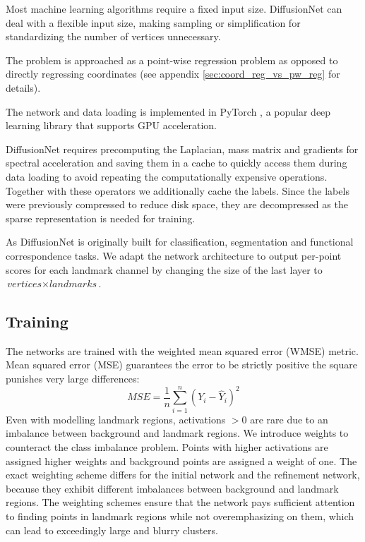 \documentclass[class=article, crop=false]{standalone}
\begin{document}
Most machine learning algorithms require a fixed input size. DiffusionNet can deal with a flexible input size, making sampling or simplification for standardizing the number of vertices unnecessary.

The problem is approached as a point-wise regression problem as opposed to directly regressing coordinates (see appendix \ref{sec:coord_reg_vs_pw_reg} for details).

The network and data loading is implemented in PyTorch \cite{NEURIPS2019_9015}, a popular deep learning library that supports GPU acceleration.

DiffusionNet requires precomputing the Laplacian, mass matrix and gradients for spectral acceleration and saving them in a cache to quickly access them during data loading to avoid repeating the computationally expensive operations. Together with these operators we additionally cache the labels. Since the labels were previously compressed to reduce disk space, they are decompressed as the sparse representation is needed for training.

As DiffusionNet is originally built for classification, segmentation and functional correspondence tasks. We adapt the network architecture to output per-point scores for each landmark channel by changing the size of the last layer to $\textit{vertices} \times \textit{landmarks}$.


\subsection{Training}
The networks are trained with the weighted mean squared error (WMSE) metric. Mean squared error (MSE) guarantees the error to be strictly positive the square punishes very large differences:
\begin{equation}
    MSE = \frac{1}{n}\sum^n_{i=1} (Y_i - \hat{Y}_i)^2
\end{equation}
Even with modelling landmark regions, activations $> 0$ are rare due to an imbalance between background and landmark regions. We introduce weights to counteract the class imbalance problem. Points with higher activations are assigned higher weights and background points are assigned a weight of one. The exact weighting scheme differs for the initial network and the refinement network, because they exhibit different imbalances between background and landmark regions. The weighting schemes ensure that the network pays sufficient attention to finding points in landmark regions while not overemphasizing on them, which can lead to exceedingly large and blurry clusters.
\end{document}

